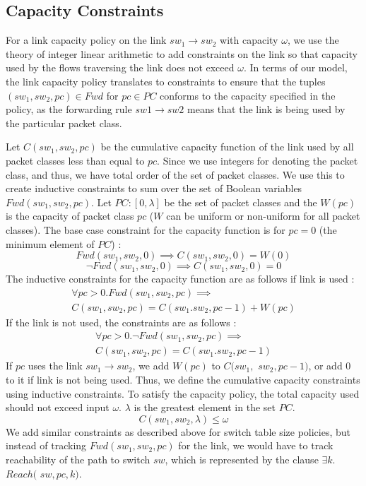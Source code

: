 \subsection{Capacity Constraints}
For a link capacity policy on the link $sw_1 \rightarrow sw_2$ with capacity $\omega$, we use the theory of integer linear arithmetic to add constraints on the link so that capacity used by the flows traversing the link does not exceed $\omega$. In terms of our model, the link capacity policy translates to constraints to ensure that the tuples $(sw_1, sw_2, pc) \in Fwd$ for $pc \in PC$ conforms to the capacity specified in the policy, as the forwarding rule $sw1 \rightarrow sw2$ means that the link is being used by the particular packet class.
 
Let $C(sw_1,sw_2,pc)$ be the cumulative capacity function of the link used by all packet classes less than equal to $pc$. Since we use integers for denoting the packet class, and thus, we have total order of the set of packet classes. We use this to create inductive constraints to sum over the set of Boolean variables $Fwd(sw_1, sw_2,pc)$. Let $PC : [0, \lambda]$ be the set of packet classes and the $W(pc)$ is the capacity of packet class $pc$ ($W$ can be uniform or non-uniform for all packet classes). 
The base case constraint for the capacity function is for $pc = 0$ (the minimum element of $PC$) :
\begin{equation}
	Fwd(sw_1, sw_2, 0) \implies C(sw_1, sw_2, 0) = W(0)
\end{equation}
\begin{equation}
	\neg Fwd(sw_1, sw_2, 0) \implies C(sw_1, sw_2, 0) = 0
\end{equation} 
The inductive constraints for the capacity function are as follows if link is used : 
\begin{multline}
	\forall pc > 0. Fwd(sw_1,sw_2,pc) \implies \\ C(sw_1, sw_2, pc) =  C(sw_1. sw_2, pc - 1) + W(pc)
\end{multline}
If the link is not used, the constraints are as follows : 
\begin{multline}
\forall pc > 0. \neg Fwd(sw_1,sw_2,pc) \implies \\ C(sw_1, sw_2, pc) =  C(sw_1. sw_2, pc - 1)
\end{multline}
If $pc$ uses the link $sw_1 \rightarrow sw_2$, we add $W(pc)$ to $C(sw_1,$ $sw_2,pc-1)$, or add 0 to it if link is not being used. Thus, we define the cumulative capacity constraints using inductive constraints. To satisfy the capacity policy, the total capacity used should not exceed input $\omega$. $\lambda$ is the greatest element in the set $PC$. 
\begin{equation}
	C(sw_1, sw_2, \lambda) \leq \omega	
\end{equation} 
We add similar constraints as described above for switch table size policies, but instead of tracking $Fwd(sw_1, sw_2,pc)$ for the link, we would have to track reachability of the path to switch $sw$, which is represented by the clause $\exists k$. $Reach($ $sw,pc,k)$.
